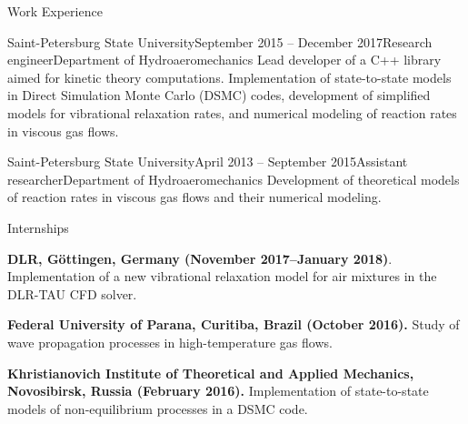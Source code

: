 \documentclass{resume} %
\begin{document}
\begin{rSection}{Work Experience}
\begin{rSubsection}{Saint-Petersburg State University}{September 2015 -- December 2017}{Research engineer}{Department of Hydroaeromechanics}
Lead developer of a C++ library aimed for kinetic theory computations. Implementation of state-to-state models in Direct Simulation Monte Carlo (DSMC) codes, development of simplified models for vibrational relaxation rates, and numerical modeling of reaction rates in viscous gas flows.
\end{rSubsection}

\begin{rSubsection}{Saint-Petersburg State University}{April 2013 -- September 2015}{Assistant researcher}{Department of Hydroaeromechanics}
Development of theoretical models of reaction rates in viscous gas flows and their numerical modeling.
\end{rSubsection}



\begin{rSubsection}{Internships}{}{}{}
\item \textbf{DLR, G\"{o}ttingen, Germany (November 2017--January 2018)}.
Implementation of a new  vibrational relaxation model for air mixtures in the DLR-TAU CFD solver.

\item \textbf{Federal University of Parana, Curitiba, Brazil (October 2016).}
Study of wave propagation processes in high-temperature gas flows.

\item \textbf{Khristianovich Institute of Theoretical and Applied Mechanics, Novosibirsk, Russia (February 2016).}
Implementation of state-to-state models of non-equilibrium processes in a DSMC code.
\end{rSubsection}
\end{rSection}
\newpage
\end{document}
